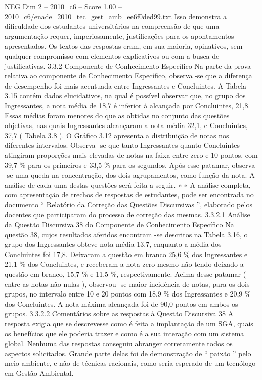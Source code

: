 \begin{textsample}{NEG Dim 2 – 2010\_c6 – Score 1.00 – 2010\_c6/enade\_2010\_tec\_gest\_amb\_ee6f0ded99.txt}
Isso demonstra a dificuldade dos estudantes universitários na compreensão de que uma argumentação requer, imperiosamente, justificações para os apontamentos apresentados.
Os textos das respostas eram, em sua maioria, opinativos, sem qualquer compromisso com elementos explicativos ou com a busca de justificativas. 3.3.2 Componente de Conhecimento Específico Na parte da prova relativa ao componente de Conhecimento Específico, observa -se que a diferença de desempenho foi mais acentuada entre Ingressantes e Concluintes.
A Tabela 3.15 contém dados elucidativos, na qual é possível observar que, no grupo dos Ingressantes, a nota média de 18,7 é inferior à alcançada por Concluintes, 21,8.
Essas médias foram menores do que as obtidas no conjunto das questões objetivas, nas quais Ingressantes alcançaram a nota média 32,1, e Concluintes, 37,7 ( Tabela 3.8 ).
O Gráfico 3.12 apresenta a distribuição de notas nos diferentes intervalos.
Observa -se que tanto Ingressantes quanto Concluintes atingiram proporções mais elevadas de notas na faixa entre zero e 10 pontos, com 39,7 \% para os primeiros e 33,5 \% para os segundos.
Após esse patamar, observa -se uma queda na concentração, dos dois agrupamentos, como função da nota.
A análise de cada uma destas questões será feita a seguir. ∗ ∗ A análise completa, com apresentação de trechos de respostas de estudantes, pode ser encontrada no documento “ Relatório da Correção das Questões Discursivas ”, elaborado pelos docentes que participaram do processo de correção das mesmas. 3.3.2.1 Análise da Questão Discursiva 38 do Componente de Conhecimento Específico Na questão 38, cujos resultados aferidos encontram -se descritos na Tabela 3.16, o grupo dos Ingressantes obteve nota média 13,7, enquanto a média dos Concluintes foi 17,8.
Deixaram a questão em branco 25,6 \% dos Ingressantes e 21,1 \% dos Concluintes, e receberam a nota zero mesmo não tendo deixado a questão em branco, 15,7 \% e 11,5 \%, respectivamente.
Acima desse patamar ( entre as notas não nulas ), observou -se maior incidência de notas, para os dois grupos, no intervalo entre 10 e 20 pontos com 18,9 \% dos Ingressantes e 20,9 \% dos Concluintes.
A nota máxima alcançada foi de 90,0 pontos em ambos os grupos. 3.3.2.2 Comentários sobre as respostas à Questão Discursiva 38 A resposta exigia que se descrevesse como é feita a implantação de um SGA, quais os benefícios que ele poderia trazer e como é a sua interação com um sistema global.
Nenhuma das respostas conseguiu abranger corretamente todos os aspectos solicitados.
Grande parte delas foi de demonstração de “ paixão ” pelo meio ambiente, e não de técnicas racionais, como seria esperado de um tecnólogo em Gestão Ambiental.

\end{textsample}
